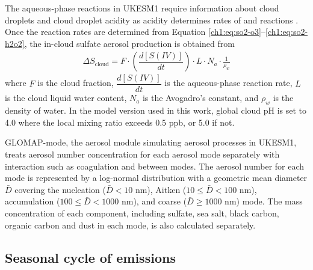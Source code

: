The aqueous-phase reactions in UKESM1 require information about cloud droplets and cloud droplet acidity as acidity determines rates of  and  reactions \citep{seinfeldAtmosphericChemistryPhysics2016}. Once the reaction rates are determined from Equation \ref{ch1:eq:so2-o3}--\ref{ch1:eq:so2-h2o2}, the in-cloud sulfate aerosol production is obtained from
\begin{align}
    \Delta S_{\mathrm{cloud}} = F \cdot \left( \dfrac{d[S(IV)]}{dt}\right) \cdot L \cdot N_a \cdot \frac{1}{\rho_w} \label{ch4:eq:in-cloud-sulfate-prod}
\end{align}
where $F$ is the cloud fraction, $ \dfrac{d[S(IV)]}{dt}$ is the aqueous-phase reaction rate, $L$ is the cloud liquid water content, $N_a$ is the Avogadro's constant, and $\rho_w$ is the density of water. In the model version used in this work, global cloud pH is set to 4.0 where the local  mixing ratio exceeds 0.5 ppb, or 5.0 if not.


GLOMAP-mode, the aerosol module simulating aerosol processes in UKESM1, treats aerosol number concentration for each aerosol mode separately with interaction such as coagulation and between modes. The aerosol number for each mode is represented by a log-normal distribution with a geometric mean diameter $\bar{D}$ covering the nucleation ($\bar{D} < 10$ \unit{\nano\metre}), Aitken ($10 \leq \bar{D} < 100$ \unit{\nano\metre}), accumulation ($100 \leq \bar{D} < 1000$ \unit{\nano\metre}), and coarse ($\bar{D} \geq 1000$ \unit{\nano\metre}) mode. The mass concentration of each component, including sulfate, sea salt, black carbon, organic carbon and dust in each mode, is also calculated separately. 




\subsection{Seasonal cycle of  emissions}

